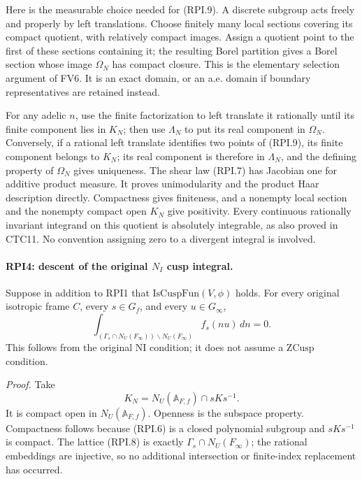 Here is the measurable choice needed for (RPI.9).  A discrete
subgroup acts freely and properly by left translations.
Choose finitely many local sections covering its compact quotient,
with relatively compact images.  Assign a quotient point to the
first of these sections containing it; the resulting Borel
partition gives a Borel section whose image \(\Omega_N\) has
compact closure.  This is the elementary selection argument of
FV6.  It is an exact domain, or an a.e. domain if boundary
representatives are retained instead.

For any adelic \(n\), use the finite factorization to left
translate it rationally until its finite component lies in \(K_N\);
then use \(\Lambda_N\) to put its real component in \(\Omega_N\).
Conversely, if a rational left translate identifies two points
of (RPI.9), its finite component belongs to \(K_N\); its real
component is therefore in \(\Lambda_N\), and the defining
property of \(\Omega_N\) gives uniqueness.
The shear law (RPI.7) has Jacobian one for additive product
measure.  It proves unimodularity and the product Haar
description directly.  Compactness gives finiteness, and a
nonempty local section and the nonempty compact open \(K_N\)
give positivity.  Every continuous rationally invariant
integrand on this quotient is absolutely integrable, as also
proved in CTC11.  No convention assigning zero to a divergent
integral is involved.

\paragraph{RPI4: descent of the original \(N_I\) cusp integral.}
\label{claim:RPI4}
Suppose in addition to RPI1 that
\(\mathrm{IsCuspFun}(V,\phi)\) holds.  For every original isotropic
frame \(C\), every \(s\in G_f\), and every \(u\in G_\infty\),
\[
 \int_{(\Gamma_s\cap N_U(F_\infty))\backslash N_U(F_\infty)}
                  f_s(nu)\,dn=0.
 \tag{RPI.10}
\]
This follows from the original \(\mathrm{NI}\) condition; it
does not assume a \(\mathrm{ZCusp}\) condition.

\emph{Proof.}
Take
\[
 K_N=N_U(\mathbb A_{F,f})\cap sKs^{-1}.
 \tag{RPI.11}
\]
It is compact open in \(N_U(\mathbb A_{F,f})\).  Openness is
the subspace property.  Compactness follows because (RPI.6)
is a closed polynomial subgroup and \(sKs^{-1}\) is compact.
The lattice (RPI.8) is exactly \(\Gamma_s\cap N_U(F_\infty)\);
the rational embeddings are injective, so no additional
intersection or finite-index replacement has occurred.

